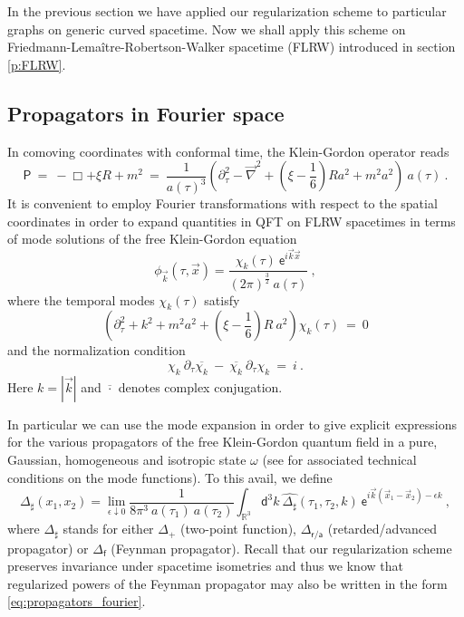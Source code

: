 \documentclass[11pt]{book}
\newcommand{\abs}[1]{\left|#1\right|}
\newcommand{\Psf}{\mathsf{P}}
\newcommand{\asf}{\mathsf{a}}
\newcommand{\dsf}{\mathsf{d}}
\newcommand{\esf}{\mathsf{e}}
\newcommand{\fsf}{\mathsf{f}}
\newcommand{\rsf}{\mathsf{r}}
\theoremstyle{break}
\begin{document}
In the previous section we have applied our regularization scheme to particular graphs on generic curved spacetime. Now we shall apply this scheme on Friedmann-Lemaître-Robertson-Walker spacetime (FLRW) introduced in section \ref{p:FLRW}.


\subsection{Propagators in Fourier space}


In comoving coordinates with conformal time, the Klein-Gordon operator reads
%
\begin{equation*}
\Psf \ = \ - \Box + \xi R + m^2 \ = \ \frac{1}{a(\tau)^3} \left(\partial^2_\tau-\vec{\nabla}^2 + \left(\xi-\frac16\right)R a^2+m^2a^2\right) \ a(\tau) \ .
\end{equation*}
%
It is convenient to employ Fourier transformations with respect to the spatial coordinates in order to expand quantities in QFT on FLRW spacetimes in terms of mode solutions of the free Klein-Gordon equation
%
\begin{equation*}
\phi_{\vec{k}}(\tau,\vec{x}) = \frac{\chi_k(\tau) \ \esf^{i\vec{k}\vec{x}}}{(2\pi)^{\frac32} \ a(\tau)} \ , 
\end{equation*}
%
where the temporal modes $\chi_k(\tau)$ satisfy
%
\begin{equation}
\left(\partial^2_\tau + k^2 + m^2 a^2 + \left( \xi - \frac16 \right) R \ a^2 \right) \chi_k(\tau) \ = \ 0
\label{eq:modes}
\end{equation}
%
and the normalization condition
%
\begin{equation}
\chi_k \ \partial_\tau \overline{\chi_k} \ - \ \overline{\chi_k} \ \partial_\tau{\chi_k} \ = \ i \ .
\label{eq:modes_normal}
\end{equation}
%
Here $k = \abs{\vec{k}}$ and $\overline{\cdot}$ denotes complex conjugation.


In particular we can use the mode expansion in order to give explicit expressions for the various propagators of the free Klein-Gordon quantum field in a pure, Gaussian, homogeneous and isotropic state $\omega$ (see \cite{PINAMONTI_2011,ZSCHOCHE_2014}
for associated technical conditions on the mode functions). To this avail, we define
%
\begin{equation}
\Delta_\sharp(x_1,x_2) = \lim_{\epsilon\downarrow 0} \frac{1}{8\pi^3 \ a(\tau_1) \ a(\tau_2)} \int_{\mathbb{R}^3} \dsf^3k \ \widehat{\Delta_\sharp}(\tau_1,\tau_2,k) \ \esf^{i\vec{k}(\vec{x}_1-\vec{x}_2)-\epsilon k} \ ,
\label{eq:propagators_fourier}
\end{equation}
%
where $\Delta_\sharp$ stands for either $\Delta_+$ (two-point function), $\Delta_{\rsf/\asf}$ (retarded/advanced propagator) or $\Delta_\fsf$ (Feynman propagator). Recall that our regularization scheme preserves invariance under spacetime isometries and thus we know that regularized powers of the Feynman propagator may also be written in the form \eqref{eq:propagators_fourier}.
\end{document}
